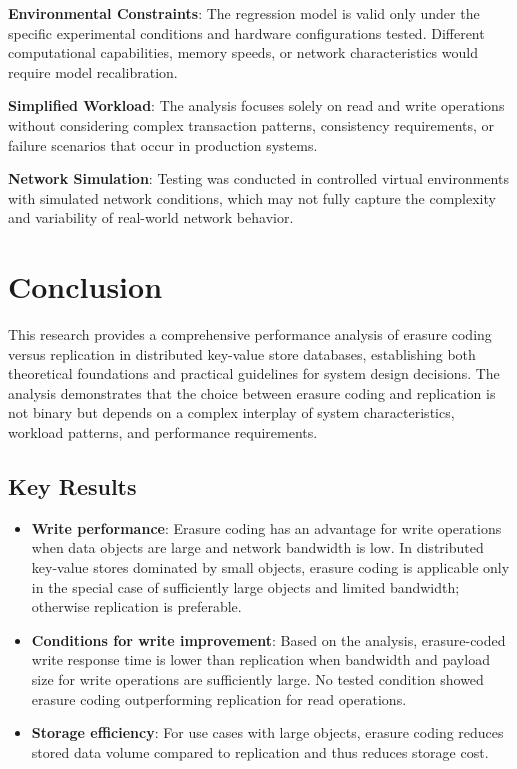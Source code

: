 \textbf{Environmental Constraints}: The regression model is valid only under the specific experimental conditions and hardware configurations tested. Different computational capabilities, memory speeds, or network characteristics would require model recalibration.

\textbf{Simplified Workload}: The analysis focuses solely on read and write operations without considering complex transaction patterns, consistency requirements, or failure scenarios that occur in production systems.

\textbf{Network Simulation}: Testing was conducted in controlled virtual environments with simulated network conditions, which may not fully capture the complexity and variability of real-world network behavior.

\section{Conclusion}

This research provides a comprehensive performance analysis of erasure coding versus replication in distributed key-value store databases, establishing both theoretical foundations and practical guidelines for system design decisions. The analysis demonstrates that the choice between erasure coding and replication is not binary but depends on a complex interplay of system characteristics, workload patterns, and performance requirements.

\subsection{Key Results}

\begin{itemize}
\item \textbf{Write performance}: Erasure coding has an advantage for write operations when data objects are large and network bandwidth is low. In distributed key-value stores dominated by small objects, erasure coding is applicable only in the special case of sufficiently large objects and limited bandwidth; otherwise replication is preferable.
\item \textbf{Conditions for write improvement}: Based on the analysis, erasure-coded write response time is lower than replication when bandwidth and payload size for write operations are sufficiently large. No tested condition showed erasure coding outperforming replication for read operations.
\item \textbf{Storage efficiency}: For use cases with large objects, erasure coding reduces stored data volume compared to replication and thus reduces storage cost.
\end{itemize}

